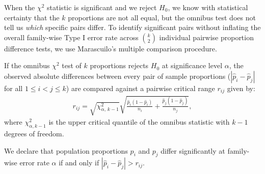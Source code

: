 When the $\chi^2$ statistic is significant and we reject $H_0$, we know with statistical certainty that the $k$ proportions are not all equal, but the omnibus test does not tell us \emph{which} specific pairs differ. To identify significant pairs without inflating the overall family-wise Type I error rate across $\binom{k}{2}$ individual pairwise proportion difference tests, we use Marascuilo's multiple comparison procedure.

\begin{teorema}
	If the omnibus $\chi^2$ test of $k$ proportions rejects $H_0$ at significance level $\alpha$, the observed absolute differences between every pair of sample proportions ($|\hat{p}_i - \hat{p}_j|$ for all $1 \leq i < j \leq k$) are compared against a pairwise critical range $r_{ij}$ given by:
	\begin{align}
		r_{ij} = \sqrt{\chi^2_{\alpha, \, k-1}} \sqrt{\frac{\hat{p}_i(1-\hat{p}_i)}{n_i} + \frac{\hat{p}_j(1-\hat{p}_j)}{n_j}},
		\label{eq:marascuilo}
	\end{align}
	where $\chi^2_{\alpha, k-1}$ is the upper critical quantile of the omnibus statistic with $k-1$ degrees of freedom. 
	
	We declare that population proportions $p_i$ and $p_j$ differ significantly at family-wise error rate $\alpha$ if and only if $|\hat{p}_i - \hat{p}_j| > r_{ij}$.
\end{teorema}
